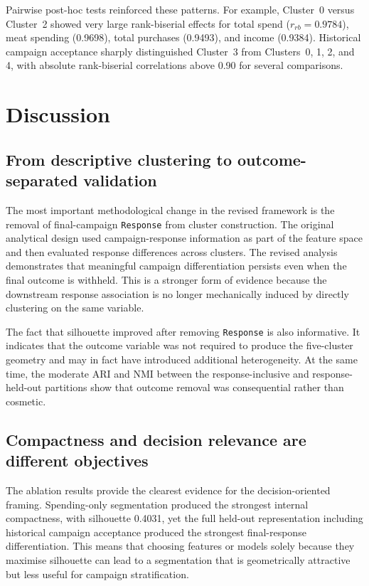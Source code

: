 \documentclass[10pt]{article}
\begin{document}
Pairwise post-hoc tests reinforced these patterns. For example, Cluster~0 versus Cluster~2 showed very large rank-biserial effects for total spend ($r_{rb}=0.9784$), meat spending (0.9698), total purchases (0.9493), and income (0.9384). Historical campaign acceptance sharply distinguished Cluster~3 from Clusters~0, 1, 2, and 4, with absolute rank-biserial correlations above 0.90 for several comparisons.

\section{Discussion}
\subsection{From descriptive clustering to outcome-separated validation}
The most important methodological change in the revised framework is the removal of final-campaign \texttt{Response} from cluster construction. The original analytical design used campaign-response information as part of the feature space and then evaluated response differences across clusters. The revised analysis demonstrates that meaningful campaign differentiation persists even when the final outcome is withheld. This is a stronger form of evidence because the downstream response association is no longer mechanically induced by directly clustering on the same variable.

The fact that silhouette improved after removing \texttt{Response} is also informative. It indicates that the outcome variable was not required to produce the five-cluster geometry and may in fact have introduced additional heterogeneity. At the same time, the moderate ARI and NMI between the response-inclusive and response-held-out partitions show that outcome removal was consequential rather than cosmetic.

\subsection{Compactness and decision relevance are different objectives}
The ablation results provide the clearest evidence for the decision-oriented framing. Spending-only segmentation produced the strongest internal compactness, with silhouette 0.4031, yet the full held-out representation including historical campaign acceptance produced the strongest final-response differentiation. This means that choosing features or models solely because they maximise silhouette can lead to a segmentation that is geometrically attractive but less useful for campaign stratification.
\end{document}
